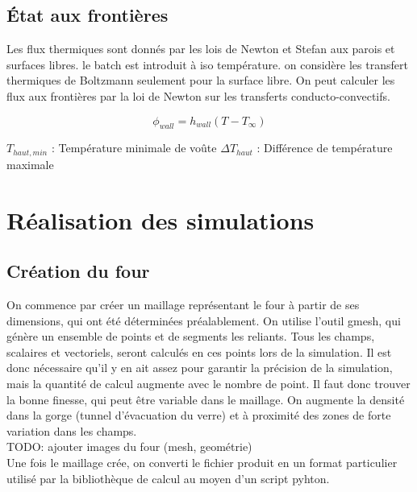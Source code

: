 \documentclass[12pt, a4paper, french, BCOR = 0pt, DIV = 10]{scrartcl}
\begin{document}
    \subsection{État aux frontières}
    
    Les flux thermiques sont donnés par les lois de Newton et Stefan aux parois et surfaces libres. le batch est introduit à iso température. on considère les transfert thermiques de Boltzmann seulement pour la surface libre.
    On peut calculer les flux aux frontières par la loi de Newton sur les transferts conducto-convectifs.\\ 
    \begin{center}
        $$
        \phi_{wall} = h_{wall} (T - T_{\infty})
        $$
    \end{center}
    
    
    
    $T_{haut, min}$ : Température minimale de voûte
    \break
    $\Delta T_{haut}$ : Différence de température maximale


	
	\section{Réalisation des simulations}

    \subsection{Création du four}
    On commence par créer un maillage représentant le four à partir de ses dimensions, qui ont été déterminées préalablement. On utilise l'outil gmesh, qui génère un ensemble de points et de segments les reliants. Tous les champs, scalaires et vectoriels, seront calculés en ces points lors de la simulation. Il est donc nécessaire qu'il y en ait assez pour garantir la précision de la simulation, mais la quantité de calcul augmente avec le nombre de point. Il faut donc trouver la bonne finesse, qui peut être variable dans le maillage. On augmente la densité dans la gorge (tunnel d'évacuation du verre) et à proximité des zones de forte variation dans les champs.\\
    TODO: ajouter images du four (mesh, geométrie)\\
    Une fois le maillage crée, on converti le fichier produit en un format particulier utilisé par la bibliothèque de calcul au moyen d'un script pyhton.
\end{document}
